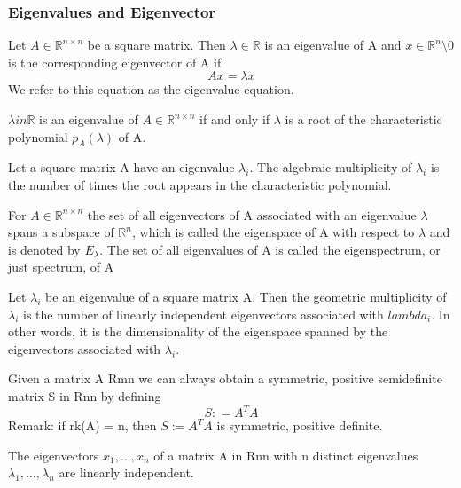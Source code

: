 \subsubsection{Eigenvalues and Eigenvector}
\begin{definition}
    Let $ A \in \mathbb{R}^{n\times n}$ be a square matrix. Then $\lambda \in \mathbb{R}$ is an eigenvalue of A and $x\in \mathbb{R}^n\setminus{0}$ is the corresponding eigenvector of A if
    \[ 
        Ax = \lambda x 
    \]
    We refer to this equation as the eigenvalue equation.
\end{definition}
\begin{theorem}
    $\lambda in \mathbb{R}$ is an eigenvalue of $A \in \mathbb{R}^{n\times n}$ if and only if $\lambda$ is a root of the characteristic polynomial $p_A(\lambda)$ of A.
\end{theorem}
\begin{definition}
    Let a square matrix A have an eigenvalue $\lambda_i$. The algebraic multiplicity of $\lambda_i$ is the number of times the root appears in the characteristic polynomial. 
\end{definition}
\begin{definition}
    For $A \in \mathbb{R}^{n \times n}$ the set of all eigenvectors of A associated with an eigenvalue $\lambda$ spans a subspace of $\mathbb{R}^n$, which is called the eigenspace of A with respect to $\lambda$ and is denoted by $E_\lambda$. The set of all eigenvalues of A is called the eigenspectrum, or just spectrum, of A
\end{definition}
\begin{definition}
    Let $\lambda_i$ be an eigenvalue of a square matrix A. Then the geometric multiplicity of $\lambda_i$ is the number of linearly independent eigenvectors associated with $lambda_i$. In other words, it is the dimensionality of the eigenspace spanned by the eigenvectors associated with $\lambda_i$. 
\end{definition}
\begin{theorem}
    Given a matrix A Rmn we can always obtain a symmetric, positive semidefinite matrix S in Rnn by defining \[ 
        S : = A^TA 
    \]
    Remark: if rk(A) = n, then $S:=A^TA$ is symmetric, positive definite. 
\end{theorem}
\begin{theorem}
    The eigenvectors $x_{1}, \ldots,x_{n}$ of a matrix A in Rnn with n distinct eigenvalues $\lambda_{1}, \ldots,\lambda_{n}$ are linearly independent. 
\end{theorem}
